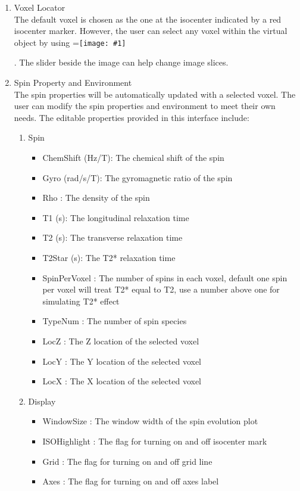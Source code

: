 \documentclass{book}%
\newcommand{\vcenteredinclude}[1]{
\begingroup
\setbox0=\hbox{\texttt{[image: \#1]}}
\parbox{\wd0}{\box0}\endgroup}
\begin{document}
\begin{enumerate}
	\item Voxel Locator \\
The default voxel is chosen as the one at the isocenter indicated by a red isocenter marker. However, the user can select any voxel within the virtual object by using \vcenteredinclude{Pictures/Cursor.eps}. The slider beside the image can help change image slices.
	
 \item Spin Property and Environment \\

The spin properties will be automatically updated with a selected voxel. The user can modify the spin properties and environment to meet their own needs. The editable properties provided in this interface include:

\begin{enumerate}

\item Spin \\
\begin{itemize}
	\item ChemShift (Hz/T): The chemical shift of the spin
	\item Gyro (rad/s/T): The gyromagnetic ratio of the spin
	\item Rho : The density of the spin
	\item T1 (s): The longitudinal relaxation time
	\item T2 (s): The transverse relaxation time
	\item T2Star (s): The T2* relaxation time
	\item SpinPerVoxel : The number of spins in each voxel, default one spin per voxel will treat T2* equal to T2, use a number above one for simulating T2* effect
	\item TypeNum : The number of spin species
	\item LocZ : The Z location of the selected voxel
	\item LocY : The Y location of the selected voxel
	\item LocX : The X location of the selected voxel
\end{itemize}

\item Display \\
\begin{itemize}
	\item WindowSize : The window width of the spin evolution plot
	\item ISOHighlight : The flag for turning on and off isocenter mark
	\item Grid : The flag for turning on and off grid line
	\item Axes : The flag for turning on and off axes label
\end{itemize}
\end{enumerate}


\end{enumerate}
\end{document}
